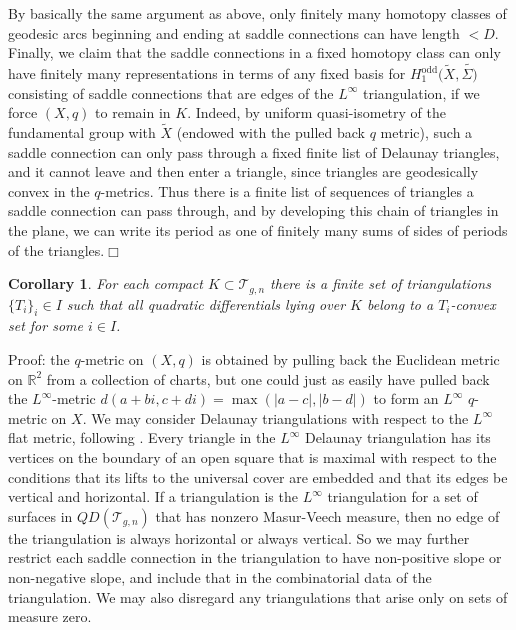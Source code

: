 \documentclass[12pt]{article}
\newtheorem{corollary}[theorem]{Corollary}
\newcommand{\rr}{\mathbb{R}}
\begin{document}
\noindent By basically the same argument as above, only finitely many homotopy classes of geodesic arcs beginning and ending at saddle connections can have length $<D$. Finally, we claim that the saddle connections in a fixed homotopy class can only have finitely many representations in terms of any fixed basis for $H_1^{\mathrm{odd}}(\tilde{X},\tilde{\Sigma)}$ consisting of saddle connections that are edges of the $L^\infty$  triangulation, if we force $(X,q)$ to remain in $K$. Indeed, by uniform quasi-isometry of the fundamental group with $\tilde{X}$ (endowed with the pulled back $q$ metric), such a saddle connection can only pass through a fixed finite list of Delaunay triangles, and it cannot leave and then enter a triangle, since  triangles are geodesically convex in the $q$-metrics. Thus there is a finite list of sequences of triangles a saddle connection can pass through, and by developing this chain of triangles in the plane, we can write its period as one of finitely many sums of sides of periods of the triangles.$\Box$

\begin{corollary}\label{CoroFinCoordSys} For each compact $K \subset \mathcal{T}_{g,n}$ there is a finite set of triangulations $\{T_i\}_i \in I$ such that all quadratic differentials lying over $K$ belong to a $T_i$-convex set for some $i \in I$.\end{corollary}

\noindent Proof: the $q$-metric on $(X,q)$ is obtained by pulling back the Euclidean metric on $\rr^2$ from a collection of charts, but one could just as easily have pulled back the $L^{\infty}$-metric $d(a+bi,c+di) = \max(|a-c|,|b-d|)$ to form an $L^\infty$ $q$-metric on $X$. We may consider Delaunay triangulations with respect to the $L^\infty$ flat metric, following \cite{FG}. Every triangle in the $L^\infty$ Delaunay triangulation has its vertices on the boundary of an open square that is maximal with respect to the conditions that its lifts to the universal cover are embedded and that its edges be vertical and horizontal. If a triangulation is the $L^\infty$ triangulation for a set of surfaces in $QD(\mathcal{T}_{g,n})$ that has nonzero Masur-Veech measure, then no edge of the triangulation is always horizontal or always vertical. So we may further restrict each saddle connection in the triangulation to have non-positive slope or non-negative slope, and include that in the combinatorial data of the triangulation. We may also disregard any triangulations that arise only on sets of measure zero.\\
\end{document}
